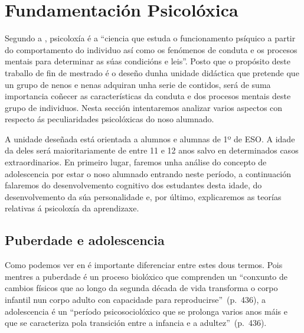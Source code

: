 

\section{Fundamentación Psicolóxica}

Segundo a , psicoloxía é a ``ciencia que estuda o funcionamento psíquico a partir do comportamento do individuo así como os fenómenos de conduta e os procesos mentais para determinar as súas condicións e leis''. Posto que o propósito deste traballo de fin de mestrado é o deseño dunha unidade didáctica que pretende que un grupo de nenos e nenas adquiran unha serie de contidos, será de suma importancia coñecer as características da conduta e dos procesos mentais deste grupo de individuos. Nesta sección intentaremos analizar varios aspectos con respecto ás peculiaridades psicolóxicas do noso alumnado.

A unidade deseñada está orientada a alumnos e alumnas de 1º de ESO. A idade da deles será maioritariamente de entre 11 e 12 anos salvo en determinados casos extraordinarios.
En primeiro lugar, faremos unha análise do concepto de adolescencia por estar o noso alumnado entrando neste período, a continuación falaremos do desenvolvemento cognitivo dos estudantes desta idade, do desenvolvemento da súa personalidade e, por último, explicaremos as teorías relativas á psicoloxía da aprendizaxe.

\subsection{Puberdade e adolescencia}
Como podemos ver en  é importante diferenciar entre estes dous termos. Pois mentres a puberdade é un proceso biolóxico que comprenden un ``conxunto de cambios físicos que ao longo da segunda década de vida transforma o corpo infantil nun corpo adulto con capacidade para reproducirse''~(p.~436), a adolescencia é un ``período psicosociolóxico que se prolonga varios anos máis e que se caracteriza pola transición entre a infancia e a adultez''~(p.~436).

